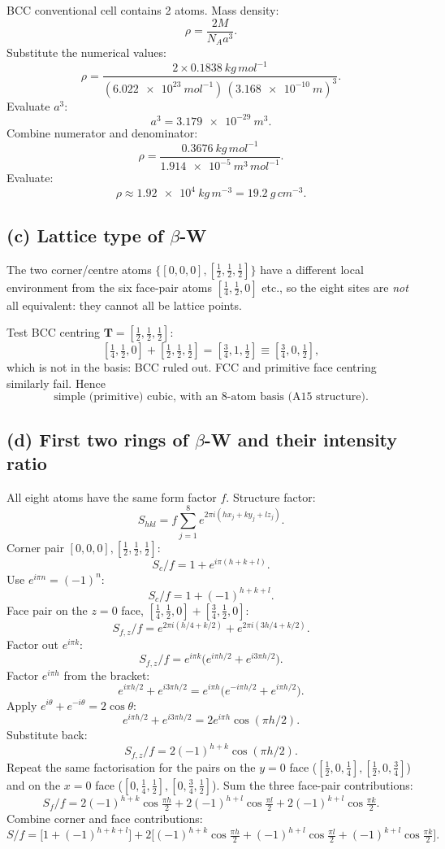 \documentclass[11pt]{article}
\begin{document}
BCC conventional cell contains 2 atoms. Mass density:
\[
\rho = \frac{2 M}{N_A a^3}.
\]
Substitute the numerical values:
\[
\rho = \frac{2 \times \SI{0.1838}{kg\,mol^{-1}}}{(\SI{6.022e23}{mol^{-1}})\,(\SI{3.168e-10}{m})^3}.
\]
Evaluate $a^3$:
\[
a^3 = \SI{3.179e-29}{m^3}.
\]
Combine numerator and denominator:
\[
\rho = \frac{\SI{0.3676}{kg\,mol^{-1}}}{\SI{1.914e-5}{m^3\,mol^{-1}}}.
\]
Evaluate:
\[
\boxed{\;\rho \approx \SI{1.92e4}{kg\,m^{-3}} = \SI{19.2}{g\,cm^{-3}}.\;}
\]

\subsection*{(c) Lattice type of $\beta$-W}

The two corner/centre atoms $\{[0,0,0],[\tfrac12,\tfrac12,\tfrac12]\}$ have a different local environment from the six face-pair atoms $[\tfrac14,\tfrac12,0]$ etc., so the eight sites are \emph{not} all equivalent: they cannot all be lattice points.

Test BCC centring $\bm T=[\tfrac12,\tfrac12,\tfrac12]$:
\[
[\tfrac14,\tfrac12,0] + [\tfrac12,\tfrac12,\tfrac12] = [\tfrac34,1,\tfrac12]\equiv [\tfrac34,0,\tfrac12],
\]
which is not in the basis: BCC ruled out. FCC and primitive face centring similarly fail. Hence
\[
\boxed{\;\text{simple (primitive) cubic, with an 8-atom basis (A15 structure).}\;}
\]

\subsection*{(d) First two rings of $\beta$-W and their intensity ratio}

All eight atoms have the same form factor $f$. Structure factor:
\[
S_{hkl} = f\sum_{j=1}^{8} e^{2\pi i(h x_j + k y_j + l z_j)}.
\]
Corner pair $[0,0,0],[\tfrac12,\tfrac12,\tfrac12]$:
\[
S_c/f = 1 + e^{i\pi(h+k+l)}.
\]
Use $e^{i\pi n}=(-1)^n$:
\[
S_c/f = 1 + (-1)^{h+k+l}.
\]
Face pair on the $z=0$ face, $[\tfrac14,\tfrac12,0]+[\tfrac34,\tfrac12,0]$:
\[
S_{f,z}/f = e^{2\pi i(h/4+k/2)}+e^{2\pi i(3h/4+k/2)}.
\]
Factor out $e^{i\pi k}$:
\[
S_{f,z}/f = e^{i\pi k}\bigl(e^{i\pi h/2}+e^{i3\pi h/2}\bigr).
\]
Factor $e^{i\pi h}$ from the bracket:
\[
e^{i\pi h/2}+e^{i3\pi h/2} = e^{i\pi h}\bigl(e^{-i\pi h/2}+e^{i\pi h/2}\bigr).
\]
Apply $e^{i\theta}+e^{-i\theta}=2\cos\theta$:
\[
e^{i\pi h/2}+e^{i3\pi h/2} = 2 e^{i\pi h}\cos(\pi h/2).
\]
Substitute back:
\[
S_{f,z}/f = 2(-1)^{h+k}\cos(\pi h/2).
\]
Repeat the same factorisation for the pairs on the $y=0$ face ($[\tfrac12,0,\tfrac14],[\tfrac12,0,\tfrac34]$) and on the $x=0$ face ($[0,\tfrac14,\tfrac12],[0,\tfrac34,\tfrac12]$). Sum the three face-pair contributions:
\[
S_f/f = 2(-1)^{h+k}\cos\tfrac{\pi h}{2} + 2(-1)^{h+l}\cos\tfrac{\pi l}{2} + 2(-1)^{k+l}\cos\tfrac{\pi k}{2}.
\]
Combine corner and face contributions:
\[
S/f = \bigl[1+(-1)^{h+k+l}\bigr] + 2\bigl[(-1)^{h+k}\cos\tfrac{\pi h}{2} + (-1)^{h+l}\cos\tfrac{\pi l}{2} + (-1)^{k+l}\cos\tfrac{\pi k}{2}\bigr].
\]
\end{document}
